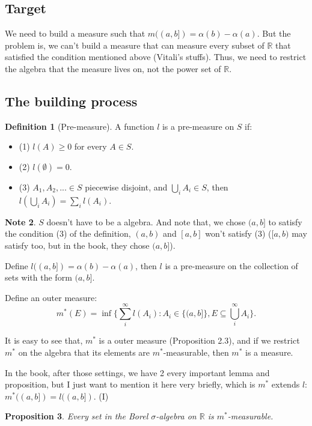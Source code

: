 \documentclass[11pt,a4paper]{article}
\theoremstyle{definition}
\newtheorem{definition}{Definition}[section]
\newtheorem{note}[definition]{Note}
\theoremstyle{plain}
\newtheorem{proposition}[definition]{Proposition}
\newcommand{\R}{\mathbb{R}}
\begin{document}
\subsection{Target}
We need to build a measure such that $m((a,b]) =  \alpha(b) - \alpha(a)$. But the problem is, we can't build a measure that can measure every subset of $\R$ that satisfied the condition mentioned above (Vitali's stuffs). Thus, we need to restrict the algebra that the measure lives on, not the power set of $\R$.

\subsection{The building process}
\begin{definition}[Pre-measure]
A function $l$ is a pre-measure on $S$ if:
\begin{itemize}
    \item (1) $l(A) \ge 0$ for every $A \in S$.
    \item (2) $l(\emptyset) = 0$.
    \item (3) $A_1, A_2,... \in S$ piecewise disjoint, and $\bigcup_iA_i \in S$, then $l(\bigcup_iA_i) = \sum_il(A_i)$.
\end{itemize}
\end{definition}

\begin{note}
$S$ doesn't have to be a algebra. And note that, we chose $(a,b]$ to satisfy the condition (3) of the definition, $(a,b)$ and $[a,b]$ won't satisfy (3) ($[a,b)$ may satisfy too, but in the book, they chose $(a,b]$).
\end{note}

Define $l((a,b]) = \alpha(b) - \alpha(a)$, then $l$ is a pre-measure on the collection of sets with the form $(a,b]$.

Define an outer measure:
\[
m^*(E) = \inf\{\sum_i^{\infty}l(A_i): A_i\in \{(a,b]\}, E\subseteq\bigcup_i^{\infty}A_i\}.
\]

It is easy to see that, $m^*$ is a outer measure (Proposition 2.3), and if we restrict $m^*$ on the algebra that its elements are $m^*$-measurable, then $m^*$ is a measure.

In the book, after those settings, we have 2 every important lemma and proposition, but I just want to mention it here very briefly, which is $m^*$ extends $l$: $m^*((a,b]) = l((a,b])$. (I)

\begin{proposition}
Every set in the Borel $\sigma$-algebra on $\R$ is $m^*$-measurable.
\end{proposition}
\end{document}

